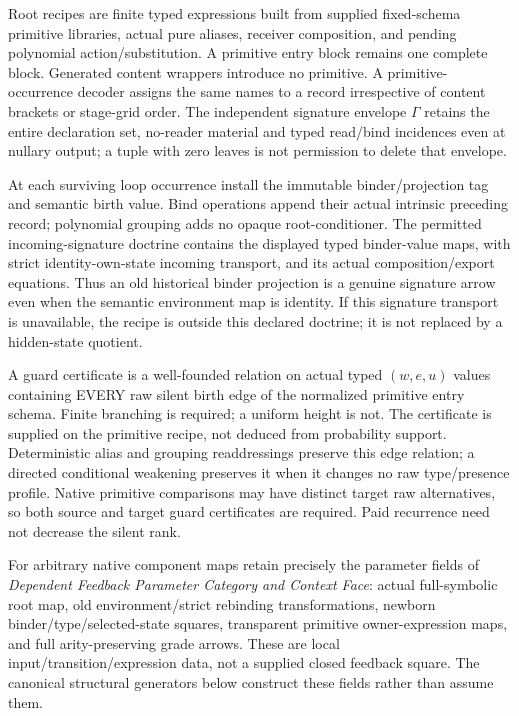 \documentclass[11pt]{article}
\begin{document}
Root recipes are finite typed expressions built from supplied fixed-schema primitive libraries, actual pure aliases, receiver composition, and pending polynomial action/substitution. A primitive entry block remains one complete block. Generated content wrappers introduce no primitive. A primitive-occurrence decoder assigns the same names to a record irrespective of content brackets or stage-grid order. The independent signature envelope $\Gamma$ retains the entire declaration set, no-reader material and typed read/bind incidences even at nullary output; a tuple with zero leaves is not permission to delete that envelope.

At each surviving loop occurrence install the immutable binder/projection tag and semantic birth value. Bind operations append their actual intrinsic preceding record; polynomial grouping adds no opaque root-conditioner. The permitted incoming-signature doctrine contains the displayed typed binder-value maps, with strict identity-own-state incoming transport, and its actual composition/export equations. Thus an old historical binder projection is a genuine signature arrow even when the semantic environment map is identity. If this signature transport is unavailable, the recipe is outside this declared doctrine; it is not replaced by a hidden-state quotient.

A guard certificate is a well-founded relation on actual typed $(w,e,u)$ values containing EVERY raw silent birth edge of the normalized primitive entry schema. Finite branching is required; a uniform height is not. The certificate is supplied on the primitive recipe, not deduced from probability support. Deterministic alias and grouping readdressings preserve this edge relation; a directed conditional weakening preserves it when it changes no raw type/presence profile. Native primitive comparisons may have distinct target raw alternatives, so both source and target guard certificates are required. Paid recurrence need not decrease the silent rank.

For arbitrary native component maps retain precisely the parameter fields of \emph{Dependent Feedback Parameter Category and Context Face}: actual full-symbolic root map, old environment/strict rebinding transformations, newborn binder/type/selected-state squares, transparent primitive owner-expression maps, and full arity-preserving grade arrows. These are local input/transition/expression data, not a supplied closed feedback square. The canonical structural generators below construct these fields rather than assume them.
\end{document}
